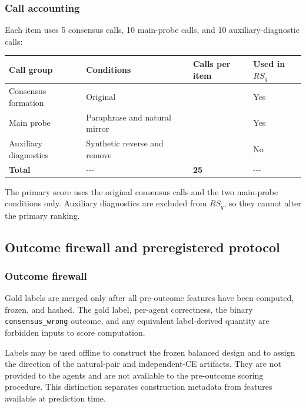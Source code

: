 \documentclass[11pt]{article}
\begin{document}
\subsubsection{Call accounting}

Each item uses 5 consensus calls, 10 main-probe calls, and 10 auxiliary-diagnostic calls:

\begin{table}[t]
\centering
\small
\begin{tabularx}{\columnwidth}{@{}>{\raggedright\arraybackslash}X>{\raggedright\arraybackslash}X>{\raggedleft\arraybackslash}X>{\centering\arraybackslash}X@{}}
\toprule
Call group & Conditions & Calls per item & Used in \(RS_q\) \\
\midrule
Consensus formation & Original & 5 & Yes \\
Main probe & Paraphrase and natural mirror & 10 & Yes \\
Auxiliary diagnostics & Synthetic reverse and remove & 10 & No \\
\textbf{Total} & -\allowbreak{}-\allowbreak{}-\allowbreak{} & \textbf{25} & -\allowbreak{}-\allowbreak{}-\allowbreak{} \\
\bottomrule
\end{tabularx}
\end{table}

The primary score uses the original consensus calls and the two main-probe conditions only. Auxiliary diagnostics are excluded from \(RS_q\), so they cannot alter the primary ranking.

\subsection{Outcome firewall and preregistered protocol}

\subsubsection{Outcome firewall}

Gold labels are merged only after all pre-outcome features have been computed, frozen, and hashed. The gold label, per-agent correctness, the binary \texttt{consensus\_wrong} outcome, and any equivalent label-derived quantity are forbidden inputs to score computation.

Labels may be used offline to construct the frozen balanced design and to assign the direction of the natural-pair and independent-CE artifacts. They are not provided to the agents and are not available to the pre-outcome scoring procedure. This distinction separates construction metadata from features available at prediction time.
\end{document}
